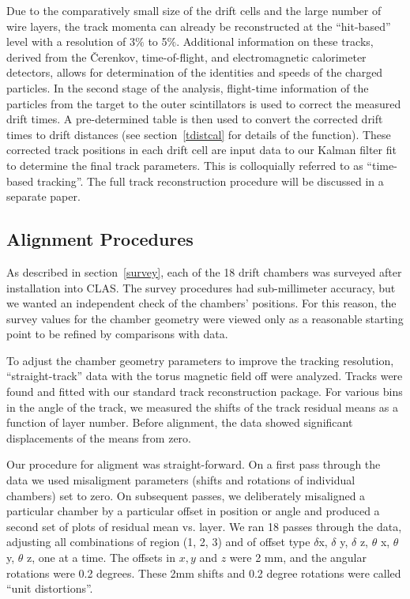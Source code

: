 Due to the comparatively small size of the drift cells and the large 
number of wire layers, the track momenta can already be reconstructed 
at the ``hit-based'' level with a 
resolution of 3$\%$ to 5$\%$.  Additional information on these tracks, derived
from the {\v C}erenkov, time-of-flight, and electromagnetic calorimeter 
detectors, allows for determination of the identities and speeds of the 
charged particles.  In the second stage of the analysis, flight-time 
information of the particles from the target to the outer scintillators is 
used to correct the measured drift times.  A pre-determined table is then used
to convert the corrected drift times to drift distances (see section~\ref{tdistcal} 
for details of the function). These corrected 
track positions in each drift cell are input data to our Kalman filter
fit to determine the final track parameters.  This is colloquially referred
to as ``time-based tracking''.
The full track reconstruction procedure will be discussed in a separate paper.

\subsection{Alignment Procedures}
\label{align}

\hskip 0.15in
As described in section~\ref{survey}, each of the 18 drift chambers was 
surveyed after installation into CLAS.  The survey procedures had sub-millimeter
accuracy, but we wanted an independent check of the chambers' positions.  For 
this reason, the survey values for the chamber geometry were viewed only as 
a reasonable starting point to be refined by comparisons with data.

To adjust the chamber geometry parameters to improve the tracking resolution,
``straight-track'' data with the torus magnetic field off were analyzed.  
Tracks were found and fitted with our standard track reconstruction package.
For various bins in the angle of the track, we measured the shifts of the
track residual means as a function of layer number. 
Before alignment, the data showed significant displacements of the means
from zero.  

Our procedure for aligment was straight-forward.  On a first pass through
the data we used misaligment parameters (shifts and rotations of individual
chambers) set to zero.  On subsequent passes, we deliberately misaligned
a particular chamber by a particular offset in position or angle and 
produced a second set of plots of residual mean vs. layer.  We ran 18 passes
through the data, adjusting all combinations of region (1, 2, 3) and
of offset type $\delta$x, $\delta$ y, $\delta$ z, $\theta$ x, 
$\theta$ y, $\theta$ z, one at
a time.  The offsets in $x, y$ and $z$ were 2 mm, and the angular rotations
were 0.2 degrees.  These 2mm shifts and 0.2 degree rotations were
called ``unit distortions''.

